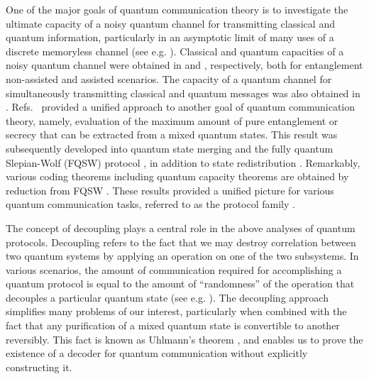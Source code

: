\documentclass[journal]{IEEEtran}
\begin{document}
One of the major goals of quantum communication theory is to investigate the ultimate capacity of a noisy quantum channel for transmitting classical and quantum information,
particularly in an asymptotic limit of many uses of a discrete memoryless channel (see e.g. \cite{wildetext,nielsentext}).
Classical and quantum capacities of a noisy quantum channel were obtained in \cite{holevo98,schumacher97,bennett1999entanglement} and \cite{lloyd1997capacity,devetak2005private,devetak2004family}, respectively, both for entanglement non-assisted and assisted scenarios.
The capacity of a quantum channel for simultaneously transmitting classical and quantum messages was also obtained in \cite{devetak2005capacity,hsieh2010entanglement}.
Refs.~\cite{devetak2004relating,devetak2005distillation} provided a unified approach to another goal of quantum communication theory, namely, evaluation of the maximum amount of pure entanglement or secrecy that can be extracted from a mixed quantum states. 
This result was subsequently developed into quantum state merging \cite{horo05,horo07} and the fully quantum Slepian-Wolf (FQSW) protocol \cite{ADHW2009}, in addition to state redistribution \cite{devetak2008exact,yard2009optimal}.
Remarkably, various coding theorems including quantum capacity theorems are obtained by reduction from FQSW \cite{ADHW2009}.
These results provided a unified picture for various quantum communication tasks, referred to as the protocol family \cite{ADHW2009,devetak2004family}.




The concept of decoupling plays a central role in the above analyses of quantum protocols.
Decoupling refers to the fact that we may destroy correlation between two quantum systems by applying an operation on one of the two subsystems. 
In various scenarios, the amount of communication required for accomplishing a quantum protocol is equal to the amount of ``randomness'' of the operation that decouples a particular quantum state (see e.g. \cite{horo07,ADHW2009}).
The decoupling approach simplifies many problems of our interest, particularly when combined with the fact that
any purification of a mixed quantum state is convertible to another reversibly.
This fact is known as Uhlmann's theorem \cite{uhlmann1976transition}, and enables us to prove the existence of a decoder for quantum communication without explicitly constructing it.
\end{document}
